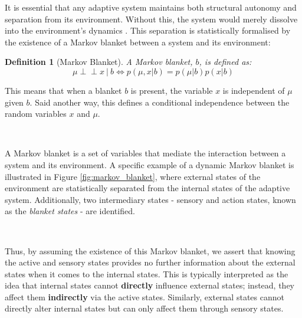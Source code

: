 \documentclass{article}
\newcommand{\indep}{\perp \!\!\! \perp}
\newtheorem{definition}{Definition}
\begin{document}
It is essential that any adaptive system maintains both structural autonomy and separation from its environment. Without this, the system would merely dissolve into the environment's dynamics \citep{parr2022ActiveInference}. This separation is statistically formalised by the existence of a Markov blanket \citep{pearl1988Probabilistic} between a system and its environment:

\begin{definition}[Markov Blanket]\label{def:markov_blanket}
A Markov blanket, $b$, is defined as:
$$ \mu \indep x \  | \ b \iff p(\mu, x | b) = p(\mu | b) p(x | b) $$
\end{definition}

This means that when a blanket $b$ is present, the variable $x$ is independent of $\mu$ given $b$. Said another way, this defines a conditional independence between the random variables $x$ and $\mu$.

\

A Markov blanket is a set of variables that mediate the interaction between a system and its environment. A specific example of a dynamic Markov blanket is illustrated in Figure \ref{fig:markov_blanket}, where external states of the environment are statistically separated from the internal states of the adaptive system. Additionally, two intermediary states - sensory and action states, known as the \textit{blanket states} - are identified. 

\

Thus, by assuming the existence of this Markov blanket, we assert that knowing the active and sensory states provides no further information about the external states when it comes to the internal states. This is typically interpreted as the idea that internal states cannot \textbf{directly} influence external states; instead, they affect them \textbf{indirectly} via the active states. Similarly, external states cannot directly alter internal states but can only affect them through sensory states.
\end{document}
